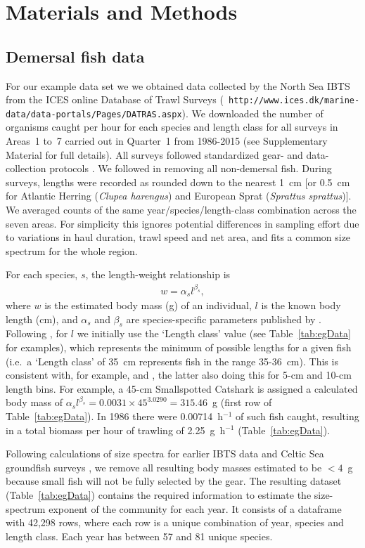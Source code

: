 \documentclass[12pt, letter]{article}
\newcommand{\eb}{\begin{eqnarray}}
\newcommand{\ee}{\end{eqnarray}}
\begin{document}
\section{Materials and Methods}

\subsection{Demersal fish data}

For our example data set we
we obtained data collected by the North Sea IBTS from the ICES online Database
of Trawl Surveys ({\tt
  http://www.ices.dk/marine-data/data-portals/Pages/DATRAS.aspx}).
We downloaded the number of
organisms caught per hour for each species and
length class for all surveys in Areas~1 to~7 carried out in Quarter~1
from 1986-2015 (see Supplementary Material for full details).
All surveys followed standardized
gear- and data-collection protocols \citep{ices15}.
We followed
\citet{ffrr12} in removing all non-demersal fish.
During surveys, lengths were recorded as rounded
down to the nearest 1~cm [or 0.5~cm for Atlantic Herring (\emph{Clupea
  harengus}) and European Sprat (\emph{Sprattus sprattus})].
We averaged counts of the same year/species/length-class combination
across the seven areas.
For simplicity this ignores potential differences in
sampling effort due to variations in haul duration, trawl speed and net area,
and fits a common size spectrum for the whole region.

For each species, $s$, the length-weight relationship is
\eb
w = \alpha_s l^{\beta_s},
\label{lw}
\ee
where $w$ is the estimated body mass (g) of an individual, $l$ is the known
body length (cm), and $\alpha_s$ and $\beta_s$ are species-specific parameters
published by \citet{ffrr12}. Following \citet{ffrr12}, for $l$ we initially use
the `Length class' value (see
Table~\ref{tab:egData} for examples), which represents the minimum of possible
lengths for a given fish (i.e.~a `Length class' of 35~cm represents fish in the
range 35-36~cm). This is consistent with, for example, \citet{blan05} and
\citet{dgpr05}, the latter also doing this for 5-cm and 10-cm length
bins. For example, a 45-cm Smallspotted Catshark is assigned a calculated
body mass of $\alpha_s l^ {\beta_s} = 0.0031 \times 45^{3.0290} = 315.46$~g
(first row of Table~\ref{tab:egData}). In 1986 there were 0.00714~h$^{-1}$ of such fish caught,
resulting in a total biomass per hour of trawling of
2.25~g~h$^{-1}$ (Table~\ref{tab:egData}).

Following calculations of size spectra for earlier IBTS data \citep{pj05} and
Celtic Sea groundfish surveys \citep{blan05}, we remove all resulting body
masses estimated to be $<4$~g because small fish will not be fully selected by
the gear.  The resulting dataset (Table~\ref{tab:egData}) contains the required
information to estimate the size-spectrum exponent of the community for each
year. It consists of a dataframe with 42,298 rows, where each row is a unique
combination of year, species and length class. Each year has between 57 and 81
unique species.
\end{document}
